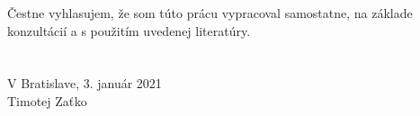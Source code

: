 \thispagestyle{empty}
\mbox{}\vfill
\noindent Čestne vyhlasujem, že som túto prácu vypracoval samostatne, na základe konzultácií a s použitím uvedenej literatúry.
\\
\\
\\

\noindent V Bratislave, 3. január 2021\\

\hfill Timotej Zaťko \hspace{6mm}

\newpage\null\thispagestyle{empty}\newpage


